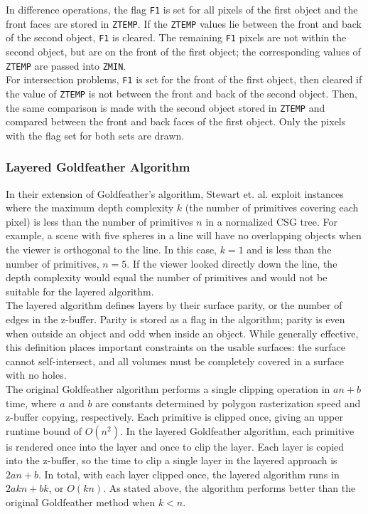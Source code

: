 \documentclass[12pt]{article}
\begin{document}
\begin{doublespace}
In difference operations, the flag \texttt{F1} is set for all pixels of the first object and the front faces are stored in \texttt{ZTEMP}. If the \texttt{ZTEMP} values lie between the front and back of the second object, \texttt{F1} is cleared. The remaining \texttt{F1} pixels are not within the second object, but are on the front of the first object; the corresponding values of \texttt{ZTEMP} are passed into \texttt{ZMIN}.\\

For intersection problems, \texttt{F1} is set for the front of the first object, then cleared if the value of \texttt{ZTEMP} is not between the front and back of the second object. Then, the same comparison is made with the second object stored in \texttt{ZTEMP} and compared between the front and back faces of the first object. Only the pixels with the flag set for both sets are drawn.

\subsubsection{Layered Goldfeather Algorithm}
In their extension of Goldfeather's algorithm, Stewart et. al. exploit instances where the maximum depth complexity $k$ (the number of primitives covering each pixel) is less than the number of primitives $n$ in a normalized CSG tree\cite{layered_gold}. For example, a scene with five spheres in a line will have no overlapping objects when the viewer is orthogonal to the line. In this case, $k=1$ and is less than the number of primitives, $n=5$. If the viewer looked directly down the line, the depth complexity would equal the number of primitives and would not be suitable for the layered algorithm.\\

The layered algorithm defines layers by their surface parity, or the number of edges in the z-buffer. Parity is stored as a flag in the algorithm; parity is even when outside an object and odd when inside an object. While generally effective, this definition places important constraints on the usable surfaces: the surface cannot self-intersect, and all volumes must be completely covered in a surface with no holes\cite{layered_gold}.\\

The original Goldfeather algorithm performs a single clipping operation in $an+b$ time, where $a$ and $b$ are constants determined by polygon rasterization speed and z-buffer copying, respectively\cite{layered_gold}. Each primitive is clipped once, giving an upper runtime bound of $O(n^2)$. In the layered Goldfeather algorithm, each primitive is rendered once into the layer and once to clip the layer. Each layer is copied into the z-buffer, so the time to clip a single layer in the layered approach is $2an+b$. In total, with each layer clipped once, the layered algorithm runs in $2akn+bk$, or $O(kn)$\cite{layered_gold}. As stated above, the algorithm performs better than the original Goldfeather method when $k<n$.


\end{doublespace}
\end{document}
